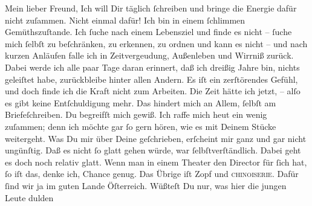 \begin{ledgroupsized}[t]{13cm}
           \pstart\center{}Mein lieber Freund,\pend\pstart
           Ich will Dir täglich ſchreiben und bringe die Energie dafür nicht zuſammen. Nicht
               einmal dafür! Ich bin in einem ſchlimmen Gemüthszuſtande. Ich ſuche nach einem
               Lebensziel und finde es nicht – ſuche mich ſelbſt zu beſchränken, zu erkennen, zu
               ordnen und kann es nicht – und nach kurzen Anläufen falle ich in Zeitvergeudung,
               Außenleben und Wirrniß zurück. Dabei werde ich alle paar Tage daran erinnert, daß ich
               dreißig Jahre bin, nichts geleiſtet habe, zurückbleibe hinter allen Andern. Es iſt
               ein zerſtörendes Gefühl, und doch finde ich die {\pb}Kraft nicht zum Arbeiten. Die Zeit hätte ich jetzt, – alſo es gibt keine
               Entſchuldigung mehr. Das hindert mich an Allem, ſelbſt am Briefeſchreiben. Du
               begreifſt mich gewiß.\pend
           \pstart
           Ich raffe mich heut ein wenig zuſammen; denn ich
               möchte gar ſo gern hören, wie es mit Deinem Stücke weitergeht. Was Du mir über Deine \label{K_L02620_1v}\label{K_L02620_1h} geſchrieben, erſcheint mir ganz und gar nicht ungünſtig. Daß es nicht ſo
               glatt gehen würde, war ſelbſtverſtändlich. Dabei geht es doch noch relativ glatt.
               Wenn man in einem Theater den Director für ſich hat, ſo iſt das, denke ich, Chance
               genug. Das {\pb}Übrige iſt Zopf und \textsc{chinoiserie}. Dafür ſind wir ja im guten Lande Öſterreich. Wüßteſt Du nur, was hier die jungen Leute dulden

\end{ledgroupsized}
